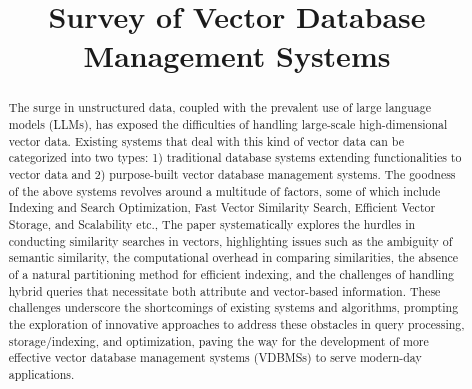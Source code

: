 \documentclass[conference]{IEEEtran}
\begin{document}
\title{Survey of Vector Database Management Systems}

\author{
\and
{}
\and
{}
}

\maketitle

\begin{abstract}
\normalfont The surge in unstructured data, coupled with the prevalent use of large language models (LLMs), has exposed the difficulties of handling large-scale high-dimensional vector data. Existing systems that deal with this kind of vector data can be categorized into two types: 1) traditional database systems extending functionalities to vector data and 2) purpose-built vector database management systems. The goodness of the above systems revolves around a multitude of factors, some of which include Indexing and Search Optimization, Fast Vector Similarity Search, Efficient Vector Storage, and Scalability etc., The paper systematically explores the hurdles in conducting similarity searches in vectors, highlighting issues such as the ambiguity of semantic similarity, the computational overhead in comparing similarities, the absence of a natural partitioning method for efficient indexing, and the challenges of handling hybrid queries that necessitate both attribute and vector-based information. These challenges underscore the shortcomings of existing systems and algorithms, prompting the exploration of innovative approaches to address these obstacles in query processing, storage/indexing, and optimization, paving the way for the development of more effective vector database management systems (VDBMSs) to serve modern-day applications.
\end{abstract}
\end{document}
